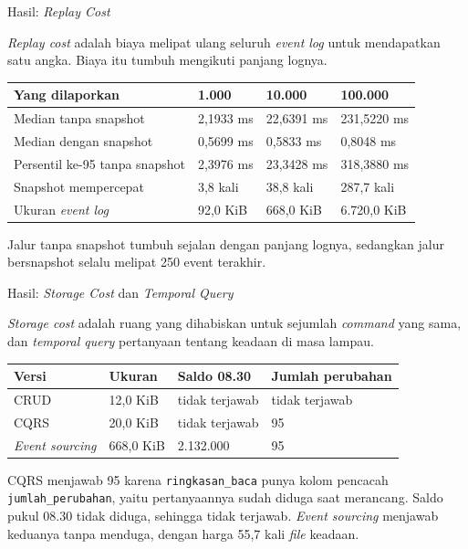 \documentclass[aspectratio=169, table, 12pt]{beamer}
\begin{document}
\begin{frame}{{\Large Hasil: \textit{Replay Cost}}}
  \vspace{4pt}
  \raggedright
  {\small \textit{Replay cost} adalah biaya melipat ulang seluruh
  \textit{event log} untuk mendapatkan satu angka. Biaya itu tumbuh mengikuti
  panjang lognya.}

  \vspace{4pt}
  \centering
  \small
  \begin{tabularx}{0.92\textwidth}{|X|l|l|l|}
    \hline
    \textbf{Yang dilaporkan} & \textbf{1.000} & \textbf{10.000} & \textbf{100.000} \\
    \hline
    Median tanpa snapshot & 2,1933 ms & 22,6391 ms & 231,5220 ms \\
    \hline
    Median dengan snapshot & 0,5699 ms & 0,5833 ms & 0,8048 ms \\
    \hline
    Persentil ke-95 tanpa snapshot & 2,3976 ms & 23,3428 ms & 318,3880 ms \\
    \hline
    Snapshot mempercepat & 3,8 kali & 38,8 kali & 287,7 kali \\
    \hline
    Ukuran \textit{event log} & 92,0 KiB & 668,0 KiB & 6.720,0 KiB \\
    \hline
  \end{tabularx}

  \vspace{6pt}
  {\small Jalur tanpa snapshot tumbuh sejalan dengan panjang lognya, sedangkan
  jalur bersnapshot selalu melipat 250 event terakhir.}
\end{frame}

\begin{frame}{{\Large Hasil: \textit{Storage Cost} dan \textit{Temporal Query}}}
  \vspace{4pt}
  \raggedright
  {\small \textit{Storage cost} adalah ruang yang dihabiskan untuk sejumlah
  \textit{command} yang sama, dan \textit{temporal query} pertanyaan tentang
  keadaan di masa lampau.}

  \vspace{4pt}
  \centering
  \small
  \begin{tabularx}{0.92\textwidth}{|l|l|l|X|}
    \hline
    \textbf{Versi} & \textbf{Ukuran} & \textbf{Saldo 08.30} & \textbf{Jumlah perubahan} \\
    \hline
    CRUD & 12,0 KiB & tidak terjawab & tidak terjawab \\
    \hline
    CQRS & 20,0 KiB & tidak terjawab & 95 \\
    \hline
    \textit{Event sourcing} & 668,0 KiB & 2.132.000 & 95 \\
    \hline
  \end{tabularx}

  \vspace{6pt}
  \raggedright
  {\small CQRS menjawab 95 karena \texttt{ringkasan\_baca} punya kolom
  pencacah \texttt{jumlah\_perubahan}, yaitu pertanyaannya sudah diduga saat
  merancang. Saldo pukul 08.30 tidak diduga, sehingga tidak terjawab.
  \textit{Event sourcing} menjawab keduanya tanpa menduga, dengan harga 55,7
  kali \textit{file} keadaan.}
\end{frame}
\end{document}
